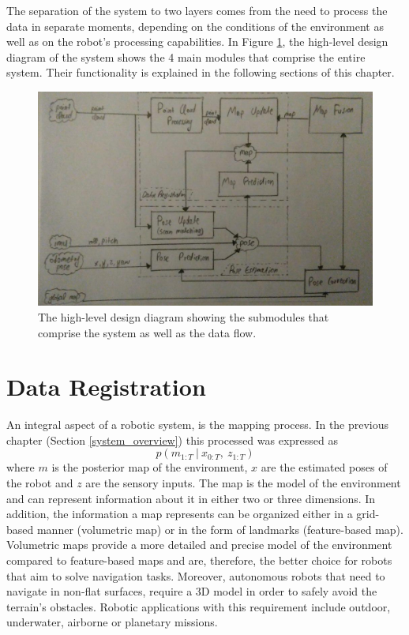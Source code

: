 The separation of the system to two layers comes from the need to process the
data in separate moments, depending on the conditions of the environment as
well as on the robot's processing capabilities.
In Figure \ref{fig:HLD}, the high-level design diagram of the system shows
the 4 main modules that comprise the entire system.
Their functionality is explained in the following sections of this chapter.

\begin{figure}[th]
    \centering
    \includegraphics[scale=0.4]{Figures/high_level_design_diagram}
    \decoRule
    \caption[High Level Design Diagram]{
        The high-level design diagram showing the submodules that comprise
        the system as well as the data flow.}
    \label{fig:HLD}
\end{figure}

\section{Data Registration}

An integral aspect of a robotic system, is the mapping process.
In the previous chapter (Section \ref{system_overview}) this processed
was expressed as
\begin{equation}
    p(m_{1:T} \ | \ x_{0:T} ,\ z_{1:T})
\end{equation}
where
$m$ is the posterior map of the environment,
$x$ are the estimated poses of the robot and
$z$ are the sensory inputs.
The map is the model of the environment and can represent information about
it in either two or three dimensions.
In addition, the information a map represents can be organized either in
a grid-based manner (volumetric map) or in the form of landmarks
(feature-based map).
Volumetric maps provide a more detailed and precise model of the environment
compared to feature-based maps and are, therefore, the better choice for
robots that aim to solve navigation tasks.
Moreover, autonomous robots that need to navigate in non-flat surfaces,
require a 3D model in order to safely avoid the terrain's obstacles.
Robotic applications with this requirement include outdoor, underwater,
airborne or planetary missions.

